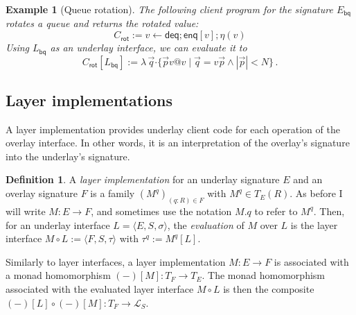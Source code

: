 \documentclass[11pt,oneside]{book}
\newtheorem{example}[theorem]{Example}
\theoremstyle{definition}
\newtheorem{definition}[theorem]{Definition}
\newcommand{\kw}[1]{\ensuremath{ \mathsf{#1} }}
\newcommand{\bdot}{\boldsymbol{\cdot}}
\begin{document}
\begin{example}[Queue rotation]
The following client program for the signature $E_\kw{bq}$
rotates a queue and returns the rotated value:
\[
  C_\kw{rot} :=
    v \mathbin\leftarrow \kw{deq} \mathbin; \kw{enq}[v] \mathbin; \eta(v)
\]
Using $L_\kw{bq}$ as an underlay interface,
we can evaluate it to
\[
  C_\kw{rot}[L_\kw{bq}] :=
    \lambda \, \vec{q} \bdot
    \{ \vec{p}v@v \mid \vec{q} = v\vec{p} \wedge |\vec{p}| < N \}
  \,.
\]
\end{example}


\subsection{Layer implementations} \label{sec:cal:impl} %

A layer implementation provides underlay client code
for each operation of the overlay interface.
In other words,
it is an interpretation of the overlay's signature
into the underlay's signature.

\begin{definition}
A \emph{layer implementation}
for an underlay signature $E$ and
an overlay signature $F$
is a family $(M^q)_{(q \mathbin: R) \in F}$
with $M^q \in T_E(R)$.
As before I will write $M : E \rightarrow F$, and
sometimes use the notation $M.q$
to refer to $M^q$.
Then,
for an underlay interface $L = \langle E, S, \sigma \rangle$,
the \emph{evaluation} of $M$ over $L$ is
the layer interface
$
  M \circ L := \langle F, S, \tau \rangle
$
with $\tau^q := M^q[L]$.
\end{definition}

Similarly to layer interfaces,
a layer implementation $M : E \rightarrow F$ is
associated with a monad homomorphism $(-)[M] : T_F \rightarrow T_E$.
The monad homomorphism associated with the evaluated
layer interface $M \circ L$
is then the composite
$(-)[L] \circ (-)[M] : T_F \rightarrow \mathcal{L}_S$.
\end{document}
